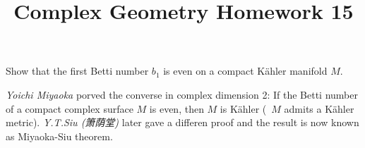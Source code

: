 \documentclass[12pt]{article}
\title{Complex Geometry Homework 15}
\author{}
\date{}
\begin{document}
\maketitle
\begin{problem}
  Show that the first Betti number \(b_1\) is even on a compact K\"ahler manifold
  \(M\).
\end{problem}
\begin{remark}
  \emph{Yoichi Miyaoka} porved the converse in complex dimension 2: If the Betti 
  number of a compact complex surface \(M\) is even, then \(M\) is K\"ahler (\ie\ 
  \(M\) admits a K\"ahler metric). \emph{Y.T.Siu (箫荫堂)} later gave a differen
  proof and the result is now known as Miyaoka-Siu theorem.
\end{remark}
\end{document}
